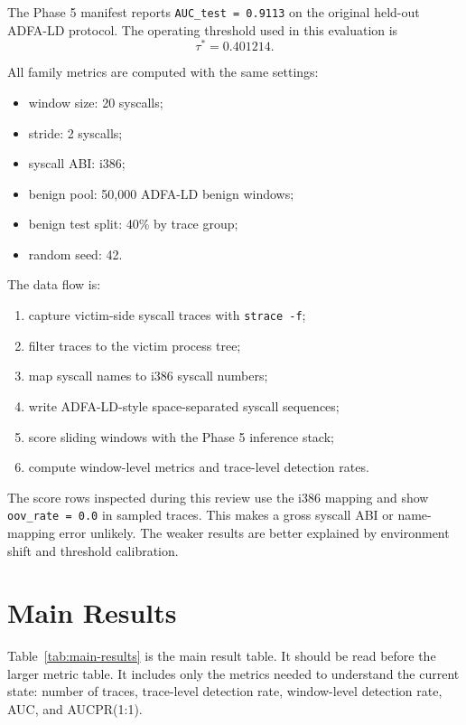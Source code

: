 \documentclass[11pt,a4paper]{article}
\begin{document}
The Phase 5 manifest reports \texttt{AUC\_test = 0.9113} on the original held-out ADFA-LD protocol. The operating threshold used in this evaluation is
\[
\tau^* = 0.401214.
\]

All family metrics are computed with the same settings:

\begin{itemize}
  \item window size: 20 syscalls;
  \item stride: 2 syscalls;
  \item syscall ABI: i386;
  \item benign pool: 50,000 ADFA-LD benign windows;
  \item benign test split: 40\% by trace group;
  \item random seed: 42.
\end{itemize}

The data flow is:

\begin{enumerate}
  \item capture victim-side syscall traces with \texttt{strace -f};
  \item filter traces to the victim process tree;
  \item map syscall names to i386 syscall numbers;
  \item write ADFA-LD-style space-separated syscall sequences;
  \item score sliding windows with the Phase 5 inference stack;
  \item compute window-level metrics and trace-level detection rates.
\end{enumerate}

The score rows inspected during this review use the i386 mapping and show \texttt{oov\_rate = 0.0} in sampled traces. This makes a gross syscall ABI or name-mapping error unlikely. The weaker results are better explained by environment shift and threshold calibration.

\section{Main Results}

Table~\ref{tab:main-results} is the main result table. It should be read before the larger metric table. It includes only the metrics needed to understand the current state: number of traces, trace-level detection rate, window-level detection rate, AUC, and AUCPR(1:1).
\end{document}
